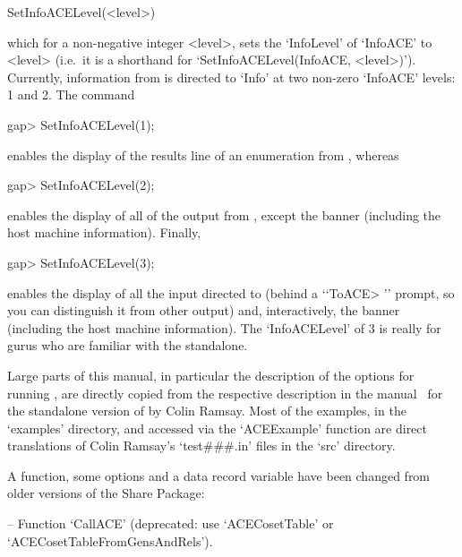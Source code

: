 \>SetInfoACELevel(<level>)

which for a non-negative integer  <level>,  sets  the  `InfoLevel'  of
`InfoACE'    to    <level>    (i.e.~it    is    a    shorthand     for
`SetInfoACELevel(InfoACE,  <level>)').  Currently,  information   from
{\ACE} is directed to `Info' at two non-zero `InfoACE' levels:  1  and
2. The command

\begintt
gap> SetInfoACELevel(1);
\endtt

enables the display of the results line of an enumeration from {\ACE},
whereas

\begintt
gap> SetInfoACELevel(2);
\endtt

enables the display of all of  the  output  from  {\ACE},  except  the
{\ACE} banner (including the host machine information). Finally,

\begintt
gap> SetInfoACELevel(3);
\endtt

enables the display of all the input  directed  to  {\ACE}  (behind  a
\lq{}`ToACE> '' prompt, so you can distinguish it from  other  output)
and, interactively, the {\ACE}  banner  (including  the  host  machine
information). The `InfoACELevel' of 3 is  really  for  gurus  who  are
familiar with the {\ACE} standalone.

\enditems


Large parts of this manual,  in  particular  the  description  of  the
options for running {\ACE}, are directly copied  from  the  respective
description in the manual~\cite{Ram99} for the standalone  version  of
{\ACE} by Colin Ramsay.  Most  of  the  examples,  in  the  `examples'
directory, and accessed  via  the  `ACEExample'  function  are  direct
translations  of  Colin  Ramsay's `test\#\#\#.in' files  in  the `src'
directory.


A function, some options and a data record variable have been changed
from older versions of the {\ACE} Share Package:

\beginlist

\item{--} Function   `CallACE'{\undoquotes{}}  (deprecated:  use
`ACECosetTable' or `ACECosetTableFromGensAndRels').

